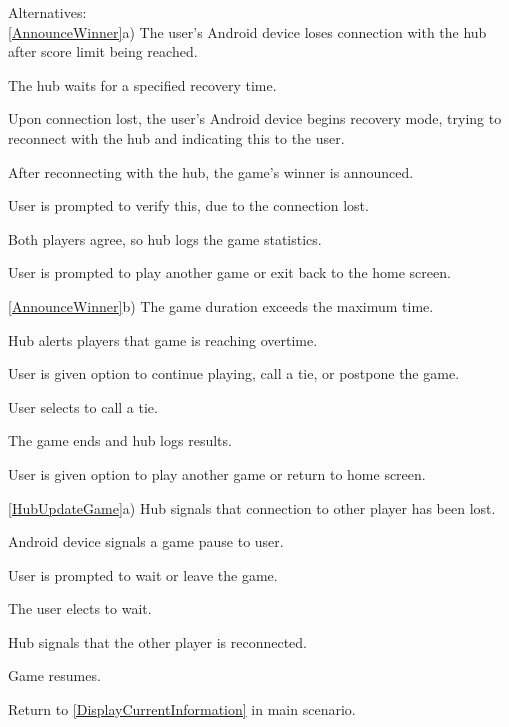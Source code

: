 \documentclass[12pt]{article}
\newenvironment{enumerate*}%
  {\begin{enumerate}%
  	\setlength{\parsep}{0pt}
    \setlength{\itemsep}{0pt}%
    \setlength{\parskip}{0pt}}%
  {\end{enumerate}}
\begin{document}
Alternatives:\\
\ref{AnnounceWinner}a) The user's Android device loses connection with the hub after score limit being reached.
\begin{enumerate*}
\item The hub waits for a specified recovery time.
\item Upon connection lost, the user's Android device begins recovery mode, trying to reconnect with the hub and indicating this to the user.
\item After reconnecting with the hub, the game's winner is announced.  
\item User is prompted to verify this, due to the connection lost. 
\item Both players agree, so hub logs the game statistics.
\item User is prompted to play another game or exit back to the home screen.
\end{enumerate*}
\ref{AnnounceWinner}b) The game duration exceeds the maximum time.
\begin{enumerate*}
\item Hub alerts players that game is reaching overtime.
\item User is given option to continue playing, call a tie, or postpone the game.
\item User selects to call a tie. 
\item The game ends and hub logs results.
\item User is given option to play another game or return to home screen.
\end{enumerate*}
\ref{HubUpdateGame}a) Hub signals that connection to other player has been lost.
\begin{enumerate*}
\item Android device signals a game pause to user.
\item User is prompted to wait or leave the game.
\item The user elects to wait.
\item Hub signals that the other player is reconnected.
\item Game resumes.
\item Return to \ref{DisplayCurrentInformation} in main scenario.
\end{enumerate*}
\end{document}

